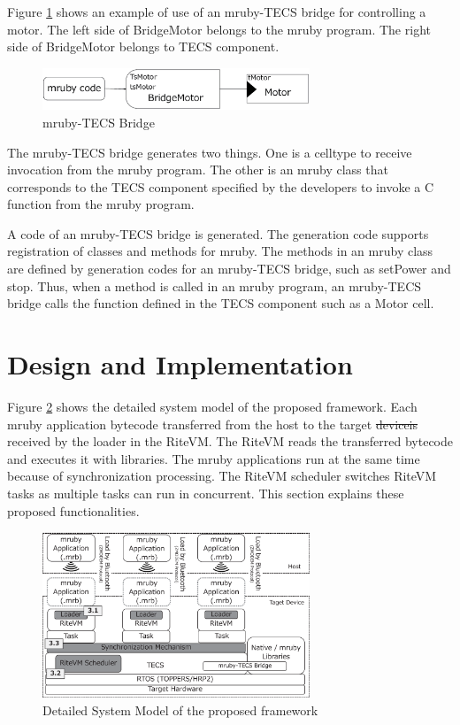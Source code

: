 \documentclass{sig-alternate-05-2015}
\providecommand{\DIFadd}[1]{{\protect\color{blue}\uwave{#1}}} %
\providecommand{\DIFdel}[1]{{\protect\color{red}\sout{#1}}}                      %
\providecommand{\DIFaddbegin}{} %
\providecommand{\DIFaddend}{} %
\providecommand{\DIFdelbegin}{} %
\providecommand{\DIFdelend}{} %
\begin{document}
Figure \ref{fig:mruby_TECS_bridge} shows an example of use of an mruby-TECS bridge for controlling a motor.
The left side of BridgeMotor belongs to the mruby program.
The right side of BridgeMotor belongs to TECS component.
\begin{figure}[t]
    \centering
    \includegraphics[width=8cm,clip]{figure/mruby_TECS_bridge.eps}
    \vspace{1mm}
\caption{mruby-TECS Bridge}
    \vspace{1mm}
\label{fig:mruby_TECS_bridge}
\end{figure}

The mruby-TECS bridge generates two things.
One is a {\myit celltype} to receive invocation from the mruby program.
The other is an mruby class that corresponds to the TECS component specified by the developers to invoke a C function from the mruby program.

A code of an mruby-TECS bridge is generated.
The generation code supports registration of classes and methods for mruby.
The methods in an mruby class are defined by generation codes for an mruby-TECS bridge, such as setPower and stop.
Thus, when a method is called in an mruby program, an mruby-TECS bridge calls the function defined in the TECS component such as a Motor {\myit cell}.

\section{Design and Implementation}
\label{sec:Design and Implementation}
Figure \ref{fig:system_model} shows the detailed system model of the proposed framework.
Each mruby application bytecode transferred from the host to the target \DIFdelbegin \DIFdel{deviceis }\DIFdelend \DIFaddbegin \DIFadd{devices }\DIFaddend received by the loader in the RiteVM.
The RiteVM reads the transferred bytecode and executes it with libraries.
The mruby applications run at the same time because of synchronization processing.
The RiteVM scheduler switches RiteVM tasks as multiple tasks can run in concurrent.
This section explains these proposed functionalities.

\begin{figure}[t]
    \centering
    \includegraphics[width=8cm,clip]{figure/system_model.eps}
    \vspace{1mm}
\caption{Detailed System Model of the proposed framework}
    \vspace{1mm}
\label{fig:system_model}
\end{figure}
\end{document}
